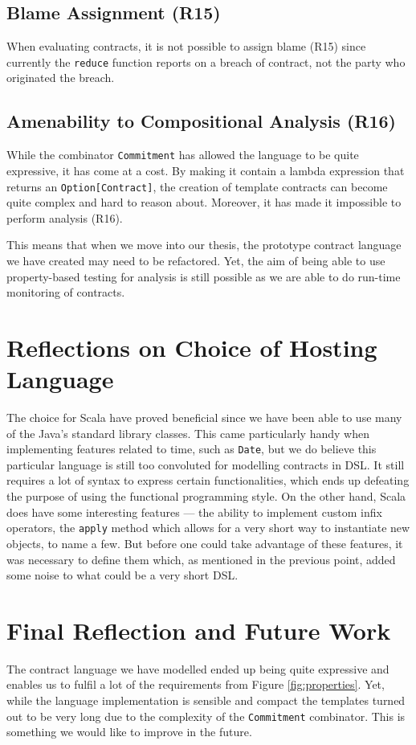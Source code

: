 \documentclass{ituthesis}
\begin{document}
\subsection{Blame Assignment (R15)}
When evaluating contracts, it is not possible to assign blame (R15) since currently the \texttt{reduce} function reports on a breach of contract, not the party who originated the breach.

\subsection{Amenability to Compositional Analysis (R16)}
While the combinator \texttt{Commitment} has allowed the language to be quite expressive, it has come at a cost. By making it contain a lambda expression that returns an \texttt{Option[Contract]}, the creation of template contracts can become quite complex and hard to reason about. Moreover, it has made it impossible to perform analysis (R16).

This means that when we move into our thesis, the prototype contract language we have created may need to be refactored. Yet, the aim of being able to use property-based testing for analysis is still possible as we are able to do run-time monitoring of contracts.

\section{Reflections on Choice of Hosting Language}

The choice for Scala have proved beneficial since we have been able to use many of the Java's standard library classes. This came particularly handy when implementing features related to time, such as \texttt{Date}, but we do believe this particular language is still too convoluted for modelling contracts in DSL. It still requires a lot of syntax to express certain functionalities, which ends up defeating the purpose of using the functional programming style. On the other hand, Scala does have some interesting features --- the ability to implement custom infix operators, the \texttt{apply} method which allows for a very short way to instantiate new objects, to name a few. But before one could take advantage of these features, it was necessary to define them which, as mentioned in the previous point, added some noise to what could be a very short DSL.

\section{Final Reflection and Future Work}
The contract language we have modelled ended up being quite expressive and enables us to fulfil a lot of the requirements from Figure \ref{fig:properties}. Yet, while the language implementation is sensible and compact the templates turned out to be very long due to the complexity of the \texttt{Commitment} combinator. This is something we would like to improve in the future.
\end{document}
